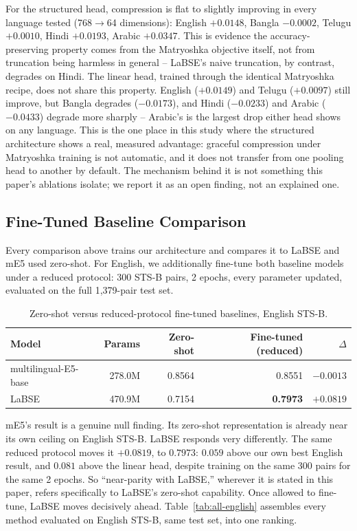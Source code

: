 \documentclass[manuscript]{acmart}
\begin{document}
For the structured head, compression is flat to slightly improving in every language tested (768$\to$64 dimensions): English $+0.0148$, Bangla $-0.0002$, Telugu $+0.0010$, Hindi $+0.0193$, Arabic $+0.0347$. This is evidence the accuracy-preserving property comes from the Matryoshka objective itself, not from truncation being harmless in general -- LaBSE's naive truncation, by contrast, degrades on Hindi. The linear head, trained through the identical Matryoshka recipe, does not share this property. English ($+0.0149$) and Telugu ($+0.0097$) still improve, but Bangla degrades ($-0.0173$), and Hindi ($-0.0233$) and Arabic ($-0.0433$) degrade more sharply -- Arabic's is the largest drop either head shows on any language. This is the one place in this study where the structured architecture shows a real, measured advantage: graceful compression under Matryoshka training is not automatic, and it does not transfer from one pooling head to another by default. The mechanism behind it is not something this paper's ablations isolate; we report it as an open finding, not an explained one.

\subsection{Fine-Tuned Baseline Comparison}
\label{sec:results:finetuned}

Every comparison above trains our architecture and compares it to LaBSE and mE5 used zero-shot. For English, we additionally fine-tune both baseline models under a reduced protocol: 300 STS-B pairs, 2 epochs, every parameter updated, evaluated on the full 1,379-pair test set.

\begin{table}[h]
\caption{Zero-shot versus reduced-protocol fine-tuned baselines, English STS-B.}
\label{tab:finetuned-baselines}
\begin{tabular}{@{}lrrrr@{}}
\toprule
Model & Params & Zero-shot & Fine-tuned (reduced) & $\Delta$ \\
\midrule
multilingual-E5-base & 278.0M & 0.8564 & 0.8551 & $-0.0013$ \\
LaBSE                 & 470.9M & 0.7154 & \textbf{0.7973} & $\mathbf{+0.0819}$ \\
\bottomrule
\end{tabular}
\end{table}

mE5's result is a genuine null finding. Its zero-shot representation is already near its own ceiling on English STS-B. LaBSE responds very differently. The same reduced protocol moves it $+0.0819$, to $0.7973$: $0.059$ above our own best English result, and $0.081$ above the linear head, despite training on the same 300 pairs for the same 2 epochs. So ``near-parity with LaBSE,'' wherever it is stated in this paper, refers specifically to LaBSE's zero-shot capability. Once allowed to fine-tune, LaBSE moves decisively ahead. Table~\ref{tab:all-english} assembles every method evaluated on English STS-B, same test set, into one ranking.
\end{document}
